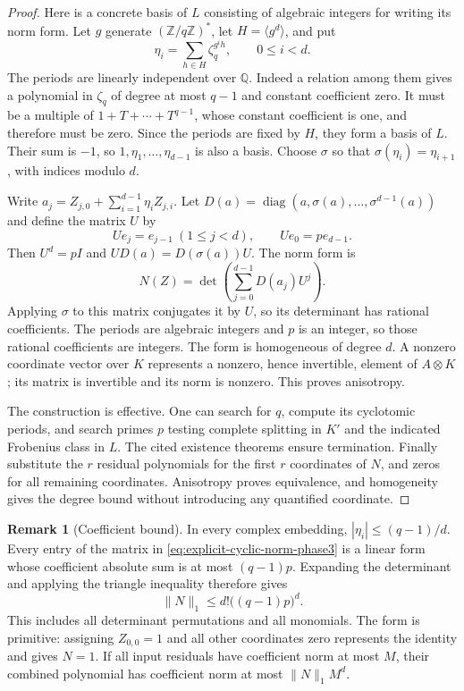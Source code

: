 \documentclass[11pt]{article}
\theoremstyle{definition}
\newtheorem{remark}[theorem]{Remark}
\begin{document}
\begin{proof}
Here is a concrete basis of $L$ consisting of algebraic integers
for writing its norm form.
Let $g$ generate $(\mathbb Z/q\mathbb Z)^*$, let
$H=\langle g^d\rangle$, and put
\[
 \eta_i=\sum_{h\in H}\zeta_q^{g^ih},\qquad 0\le i<d.
\]
The periods are linearly independent over $\mathbb Q$.
Indeed a relation among them gives a polynomial in $\zeta_q$
of degree at most $q-1$ and constant coefficient zero.
It must be a multiple of $1+T+\cdots+T^{q-1}$, whose constant
coefficient is one, and therefore must be zero.  Since the
periods are fixed by $H$, they form a basis of $L$.  Their sum
is $-1$, so $1,\eta_1,\ldots,\eta_{d-1}$ is also a basis.
Choose
$\sigma$ so that $\sigma(\eta_i)=\eta_{i+1}$, with indices
modulo $d$.

Write $a_j=Z_{j,0}+\sum_{i=1}^{d-1}\eta_i Z_{j,i}$.  Let
$D(a)=\operatorname{diag}(a,\sigma(a),\ldots,\sigma^{d-1}(a))$
and define the matrix $U$ by
\[
 Ue_j=e_{j-1}\ (1\le j<d),\qquad Ue_0=p e_{d-1}.
\]
Then $U^d=pI$ and $UD(a)=D(\sigma(a))U$.  The norm form is
\begin{equation}\label{eq:explicit-cyclic-norm-phase3}
 N(Z)=\det\left(\sum_{j=0}^{d-1}D(a_j)U^j\right).
\end{equation}
Applying $\sigma$ to this matrix conjugates it by $U$, so
its determinant has rational coefficients.  The periods are
algebraic integers and $p$ is an integer, so those rational
coefficients are integers.  The form is homogeneous of degree
$d$.  A nonzero coordinate vector over $K$ represents a
nonzero, hence invertible, element of $A\otimes K$; its matrix
is invertible and its norm is nonzero.  This proves anisotropy.

The construction is effective.  One can search for $q$, compute
its cyclotomic periods, and search primes $p$ testing complete
splitting in $K'$ and the indicated Frobenius class in $L$.
The cited existence theorems ensure termination.  Finally
substitute the $r$ residual polynomials for the first $r$
coordinates of $N$, and zeros for all remaining coordinates.
Anisotropy proves equivalence, and homogeneity gives the degree
bound without introducing any quantified coordinate.
\end{proof}

\begin{remark}[Coefficient bound]
In every complex embedding, $|\eta_i|\le(q-1)/d$.
Every entry of the matrix in
\eqref{eq:explicit-cyclic-norm-phase3} is a linear form whose
coefficient absolute sum is at most $(q-1)p$.  Expanding the
determinant and applying the triangle inequality therefore gives
\[
                       \|N\|_1\le d!\bigl((q-1)p\bigr)^d.
\]
This includes all determinant permutations and all monomials.
The form is primitive: assigning $Z_{0,0}=1$ and all other
coordinates zero represents the identity and gives $N=1$.
If all input residuals have
coefficient norm at most $M$, their combined polynomial has
coefficient norm at most $\|N\|_1M^d$.
\end{remark}
\end{document}
